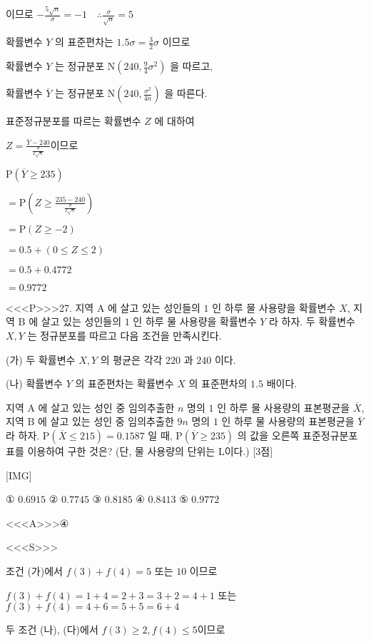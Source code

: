 \documentclass{oblivoir}
\begin{document}
이므로 $-\frac{5 \sqrt{n}}{\sigma}=-1 \quad \therefore \frac{\sigma}{\sqrt{n}}=5$

확률변수 $Y$ 의 표준편차는 $1.5 \sigma=\frac{3}{2} \sigma$ 이므로

확률변수 $Y$ 는 정규분포 $\mathrm{N}\left(240, \frac{9}{4} \sigma^{2}\right)$ 을 따르고,

확률변수 $\overline{Y}$ 는 정규분포 $\mathrm{N}\left(240, \frac{\sigma^{2}}{4 n}\right)$ 을 따른다.

표준정규분포를 따르는 확률변수 $Z$ 에 대하여

$Z=\frac{\overline{Y}-240}{\frac{\sigma}{2 \sqrt{n}}}$이므로

$\mathrm{P}(\overline{Y} \geq 235) $

$=\mathrm{P}\left(Z \geq \frac{235-240}{\frac{\sigma}{2 \sqrt{n}}}\right)$

$=\mathrm{P}(Z \geq-2)$

$=0.5+(0 \leq Z \leq 2)$

$=0.5+0.4772$

$=0.9772$


<<<P>>>27. 지역 $\mathrm{A}$ 에 살고 있는 성인들의 $1$ 인 하루 물 사용량을 확률변수 $X$, 지역 $\mathrm{B}$ 에 살고 있는 성인들의 $1$ 인 하루 물 사용량을 확률변수 $Y$ 라 하자. 두 확률변수 $X, Y$ 는 정규분포를 따르고 다음 조건을 만족시킨다.

(가) 두 확률변수 $X, Y$ 의 평균은 각각 $220$ 과 $240$ 이다.

(나) 확률변수 $Y$ 의 표준편차는 확률변수 $X$ 의 표준편차의 $1.5$ 배이다.

지역 $\mathrm{A}$ 에 살고 있는 성인 중 임의추출한 $n$ 명의 $1$ 인 하루 물 사용량의 표본평균을 $\overline{X}$, 지역 $\mathrm{B}$ 에 살고 있는 성인 중 임의추출한 $9 n$ 명의 $1$ 인 하루 물 사용량의 표본평균을 $\overline{Y}$ 라 하자. $\mathrm{P}(\overline{X} \leq 215)=0.1587$ 일 때, $\mathrm{P}(\overline{Y} \geq 235)$ 의 값을 오른쪽 표준정규분포표를 이용하여 구한 것은? (단, 물 사용량의 단위는 $\mathrm{L}$이다.) [3점]

[IMG]

① $0.6915$
② $0.7745$
③ $0.8185$
④ $0.8413$
⑤ $0.9772$



<<<A>>>④

<<<S>>>



조건 (가)에서 $f(3)+f(4)=5$ 또는 $10$ 이므로

$ f(3)+f(4)=1+4=2+3=3+2=4+1$ 또는 $f(3)+f(4)=4+6=5+5=6+4 $

두 조건 (나), (다)에서 $f(3) \geq 2, f(4) \leq 5 $이므로
\end{document}
